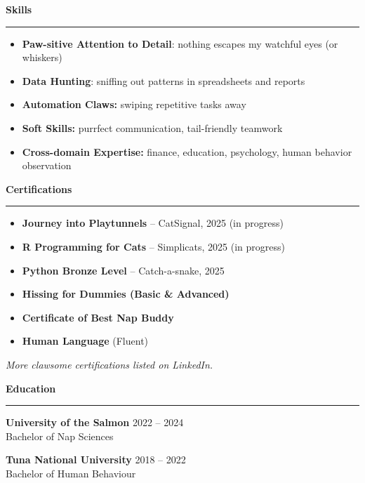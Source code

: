 \documentclass[11pt,a4paper]{article} %
\newcommand{\sectiontitle}[1]{%
  \vspace{1.2ex}%
  {\Large\bfseries\color{duskPurple} #1}%
  \vspace{0.6ex}\hrule\vspace{0.8ex}%
}
\begin{document}
\begin{paracol}{2} 

\sectiontitle{Skills}
\vspace{-1.3ex}
\begin{itemize}
  \item \textbf{Paw-sitive Attention to Detail}: nothing escapes my watchful eyes (or whiskers)
  \item \textbf{Data Hunting}: sniffing out patterns in spreadsheets and reports
  \item \textbf{Automation Claws:} swiping repetitive tasks away
  \item \textbf{Soft Skills:} purrfect communication, tail-friendly teamwork
   \item \textbf{Cross-domain Expertise:} finance, education, psychology, human behavior observation
\end{itemize}

\vspace{0.6ex}

\sectiontitle{Certifications}
\vspace{-1.3ex}
\begin{itemize}
  \item \textbf{Journey into Playtunnels} -- CatSignal, 2025 (in progress)
  \item \textbf{R Programming for Cats} -- Simplicats, 2025 (in progress)
  \item \textbf{Python Bronze Level} -- Catch-a-snake, 2025
  \item \textbf{Hissing for Dummies (Basic \& Advanced)}
  \item \textbf{Certificate of Best Nap Buddy}
  \item \textbf{Human Language} (Fluent)
\end{itemize}
\vspace{-1ex}
\textit{More clawsome certifications listed on LinkedIn.}  %

\vspace{0.6ex}

\sectiontitle{Education}
\textbf{University of the Salmon} \hfill \small 2022 -- 2024 \\
Bachelor of Nap Sciences 

\vspace{0.6ex}

\textbf{Tuna National University} \hfill \small 2018 -- 2022 \\
Bachelor of Human Behaviour


\end{paracol}
\end{document}
